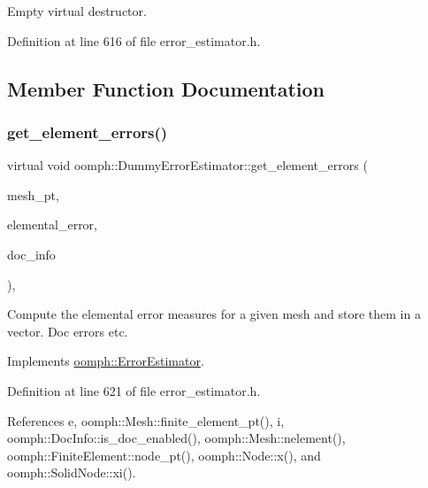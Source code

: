 Empty virtual destructor. 



Definition at line 616 of file error\+\_\+estimator.\+h.



\subsection{Member Function Documentation}
\mbox{\label{classoomph_1_1DummyErrorEstimator_a471038816556f1af7602cadbbb21d8fb}} 
\subsubsection{\texorpdfstring{get\+\_\+element\+\_\+errors()}{get\_element\_errors()}}
{\footnotesize\ttfamily virtual void oomph\+::\+Dummy\+Error\+Estimator\+::get\+\_\+element\+\_\+errors (\begin{DoxyParamCaption}\item[{\hyperlink{classoomph_1_1Mesh}{Mesh} $\ast$\&}]{mesh\+\_\+pt,  }\item[{\hyperlink{classoomph_1_1Vector}{Vector}$<$ double $>$ \&}]{elemental\+\_\+error,  }\item[{\hyperlink{classoomph_1_1DocInfo}{Doc\+Info} \&}]{doc\+\_\+info }\end{DoxyParamCaption})\hspace{0.3cm}{\ttfamily [inline]}, {\ttfamily [virtual]}}



Compute the elemental error measures for a given mesh and store them in a vector. Doc errors etc. 



Implements \hyperlink{classoomph_1_1ErrorEstimator_a77e85262d309d6e7da0ca71e98b7afff}{oomph\+::\+Error\+Estimator}.



Definition at line 621 of file error\+\_\+estimator.\+h.



References e, oomph\+::\+Mesh\+::finite\+\_\+element\+\_\+pt(), i, oomph\+::\+Doc\+Info\+::is\+\_\+doc\+\_\+enabled(), oomph\+::\+Mesh\+::nelement(), oomph\+::\+Finite\+Element\+::node\+\_\+pt(), oomph\+::\+Node\+::x(), and oomph\+::\+Solid\+Node\+::xi().

